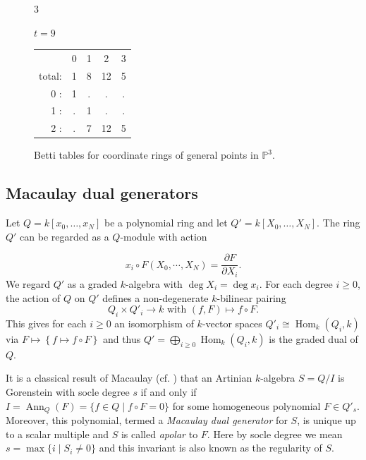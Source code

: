 \documentclass[reqno]{amsart}
\DeclareMathOperator{\Ann}{Ann}
\DeclareMathOperator{\Hom}{Hom}
\renewcommand{\P}{\mathbb{P}}
\theoremstyle{plain} %
\theoremstyle{definition}
\theoremstyle{remark}
\begin{document}
\begin{figure}[H]
\begin{center}
\begin{multicols}{3}
\columnbreak

$t=9$

\begin{tabular}{r c c c c}
 & 0 & 1 & 2 & 3 \\
total: & 1 & 8 & 12 & 5 \\
0 : & 1 & . & . & . \\
1 : & . & 1 & . & . \\
2 : & . & 7 & 12 & 5 
\end{tabular}
\end{multicols}

\end{center}
\caption{Betti tables for coordinate rings of general points in $\P^3$.}\label{fig_Betti_tables}
\end{figure}


\subsection{Macaulay dual generators} 
\label{sect:MDG}



Let $Q=k[x_0,\ldots,x_N]$ be a polynomial ring and let $Q'=k[X_0,\ldots,X_N]$. The ring $Q'$ can be
regarded as a $Q$-module with action 

\[
x_i\circ F(X_0,\cdots,X_N)=\frac{\partial F}{\partial X_i}.
\]
 We regard $Q'$ as a graded $k$-algebra with $\deg X_i=\deg x_i$.
For each degree $i\geq 0$, the action of $Q$ on $Q'$ defines a non-degenerate $k$-bilinear pairing 
\begin{equation*}
\label{eq:MDPairing}
    Q_i \times Q'_i \longrightarrow k \text{ with } (f,F) \longmapsto f \circ F.
\end{equation*}
This gives for each $i\geq 0$ an isomorphism of $k$-vector spaces $Q'_i\cong \Hom_k(Q_i,k)$ via $F\mapsto\left\{f\mapsto f\circ F\right\}$ and thus $Q'=\bigoplus_{i\geq 0}\Hom_k(Q_i,k)$ is the graded dual of $Q$.



 It is a classical result of Macaulay \cite{Macaulay} (cf. \cite[Lemma 2.14]{IK}) that an Artinian $k$-algebra $S=Q/I$ is Gorenstein with socle degree $s$ if and only if  $I=\Ann_Q(F)=\{f\in Q\mid f\circ F=0\}$ for some homogeneous polynomial $F\in Q'_s$.  Moreover, this polynomial, termed a {\em Macaulay dual generator} for $S$, is unique up to a scalar multiple and $S$ is called {\em apolar} to $F$. Here by socle degree we mean $s=\max\{i\mid S_i\neq 0\}$ and this invariant is also known as the regularity of $S$.
\end{document}
